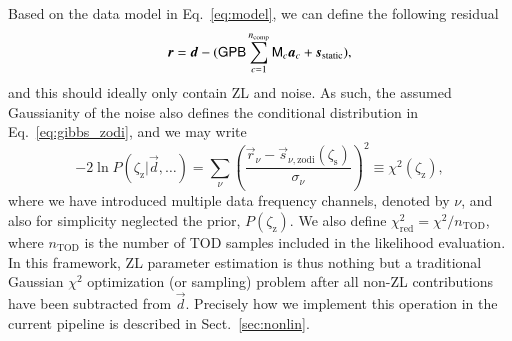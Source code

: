 \documentclass[twocolumn]{aa}
\newcommand{\dv}[0]{\vec{d}}
\newcommand{\B}[0]{\tens{B}}
\newcommand{\G}[0]{\tens{G}}
\newcommand{\s}[0]{\vec{s}}
\renewcommand{\a}[0]{\vec{a}}
\newcommand{\M}[0]{\tens{M}}
\renewcommand{\r}[0]{\vec{r}}
\renewcommand{\P}[0]{\tens{P}}
\begin{document}
Based on the data model in Eq.~\eqref{eq:model}, we can define the
following residual
\begin{equation}
\r = \dv - (\G\P\B\sum_{c=1}^{n_{\mathrm{comp}}}\M_c\a_c +
          \s_{\mathrm{static}}),
\end{equation}
and this should ideally only contain ZL and noise. As such, the
assumed Gaussianity of the noise also defines the conditional
distribution in Eq.~\eqref{eq:gibbs_zodi}, and we may write
\begin{equation}
  -2\ln P(\zeta_{\mathrm{z}}|\dv, \ldots) = \sum_{\nu}
  \left(\frac{\r_{\nu} -
    \s_{\nu,\mathrm{zodi}}(\zeta_\mathrm{s})}{\sigma_{\nu}}\right)^2 \equiv
  \chi^2 (\zeta_{\mathrm{z}}),
  \label{eq:gibbs_chisq}
\end{equation}
where we have introduced multiple data frequency channels, denoted by
$\nu$, and also for simplicity neglected the prior,
$P(\zeta_{\mathrm{z}})$. We also define
$\chi^2_{\mathrm{red}}=\chi^2/n_{\mathrm{TOD}}$, where
$n_{\mathrm{TOD}}$ is the number of TOD samples included in the
likelihood evaluation. In this framework, ZL parameter estimation is
thus nothing but a traditional Gaussian $\chi^2$ optimization (or
sampling) problem after all non-ZL contributions have been subtracted
from $\dv$. Precisely how we implement this operation in the
current pipeline is described in Sect.~\ref{sec:nonlin}.
\end{document}
